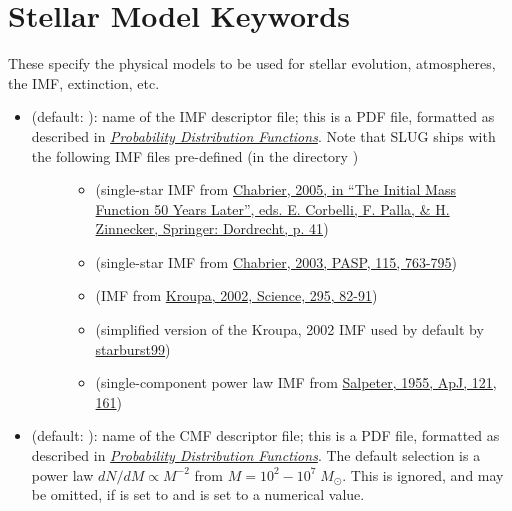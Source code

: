 \documentclass[letterpaper,10pt,english]{sphinxmanual}
\begin{document}
\section{Stellar Model Keywords}
\label{parameters:stellar-model-keywords}\label{parameters:ssec-stellar-keywords}
These specify the physical models to be used for stellar evolution, atmospheres, the IMF, extinction, etc.
\begin{itemize}
\item {} \begin{description}
\item[{ (default: ): name of the IMF descriptor file; this is a PDF file, formatted as described in {\hyperref[pdfs:sec\string-pdfs]{\emph{Probability Distribution Functions}}}. Note that SLUG ships with the following IMF files pre-defined (in the directory )}] \leavevmode\begin{itemize}
\item {} 
 (single-star IMF from \href{http://adsabs.harvard.edu/abs/2005ASSL..327...41C}{Chabrier, 2005, in ``The Initial Mass Function 50 Years Later'', eds. E. Corbelli, F. Palla, \& H. Zinnecker, Springer: Dordrecht, p. 41})

\item {} 
 (single-star IMF from \href{http://adsabs.harvard.edu/abs/2003PASP..115..763C}{Chabrier, 2003, PASP, 115, 763-795})

\item {} 
 (IMF from \href{http://adsabs.harvard.edu/abs/2002Sci...295...82K}{Kroupa, 2002, Science, 295, 82-91})

\item {} 
 (simplified version of the Kroupa, 2002 IMF used by default by \href{http://www.stsci.edu/science/starburst99/docs/default.htm}{starburst99})

\item {} 
 (single-component power law IMF from \href{http://adsabs.harvard.edu/abs/1955ApJ...121..161S}{Salpeter, 1955, ApJ, 121, 161})

\end{itemize}

\end{description}

\item {} 
 (default: ): name of the CMF descriptor file; this is a PDF file, formatted as described in {\hyperref[pdfs:sec\string-pdfs]{\emph{Probability Distribution Functions}}}. The default selection is a power law \(dN/dM \propto M^{-2}\) from \(M = 10^2 - 10^7\;M_\odot\). This is ignored, and may be omitted, if  is set to  and  is set to a numerical value.


\end{itemize}
\end{document}
